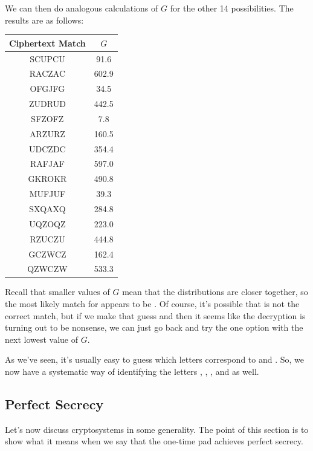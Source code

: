 \documentclass[letterpaper]{article}
\begin{document}
\begin{enumerate}
    We can then do analogous calculations of $G$ for the other 14 possibilities. The results are as follows: 
    \begin{center}
        \begin{tabular}{|c|c|}
            \hline 
            Ciphertext Match & $G$ \\ 
            \hline 
            SCUPCU & 91.6 \\ 
            RACZAC & 602.9 \\ 
            OFGJFG & 34.5 \\ 
            ZUDRUD & 442.5 \\ 
            SFZOFZ & 7.8 \\ 
            ARZURZ & 160.5 \\ 
            UDCZDC & 354.4 \\ 
            RAFJAF & 597.0 \\ 
            GKROKR & 490.8 \\ 
            MUFJUF & 39.3 \\ 
            SXQAXQ & 284.8 \\
            UQZOQZ & 223.0 \\
            RZUCZU & 444.8 \\ 
            GCZWCZ & 162.4 \\ 
            QZWCZW & 533.3 \\ 
            \hline 
        \end{tabular}
    \end{center}
    Recall that smaller values of $G$ mean that the distributions are closer together, so the most likely match for  appears to be . Of course, it's possible that  is not the correct match, but if we make that guess and then it seems like the decryption is turning out to be nonsense, we can just go back and try the one option with the next lowest value of $G$. 

    \bigskip 

    As we've seen, it's usually easy to guess which letters correspond to  and . So, we now have a systematic way of identifying the letters , , , and  as well. 
\end{enumerate}


\subsection{Perfect Secrecy}
Let's now discuss cryptosystems in some generality. The point of this section is to show what it means when we say that the one-time pad achieves perfect secrecy.
\end{document}
